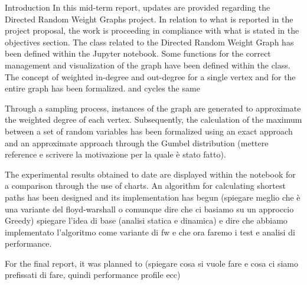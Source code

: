 \begin{projsection}{Introduction}
In this mid-term report, updates are provided regarding the Directed Random Weight Graphs project. In relation to what is reported in the project proposal, the work is proceeding in compliance with what is stated in the objectives section. 
The class related to the Directed Random Weight Graph has been defined within the Jupyter notebook. Some functions for the correct management and visualization of the graph have been defined within the class.
The concept of weighted in-degree and out-degree for a single vertex and for the entire graph has been formalized.
and cycles the same

Through a sampling process, instances of the graph are generated to approximate the weighted degree of each vertex.
Subsequently, the calculation of the maximum between a set of random variables has been formalized using an exact approach and an approximate approach through the Gumbel distribution (mettere reference e scrivere la motivazione per la quale è stato fatto). 

The experimental results obtained to date are displayed within the notebook for a comparison through the use of charts. 
An algorithm for calculating shortest paths has been designed and its implementation has begun (spiegare meglio che è una variante del floyd-warshall o comunque dire che ci basiamo su un approccio Greedy) 
spiegare l'idea di base (analisi statica e dinamica) e dire che abbiamo implementato l'algoritmo come variante di fw e che ora faremo i test e analisi di performance.

For the final report, it was planned to (spiegare cosa si vuole fare e cosa ci siamo prefissati di fare, quindi performance profile ecc) 
\end{projsection}

